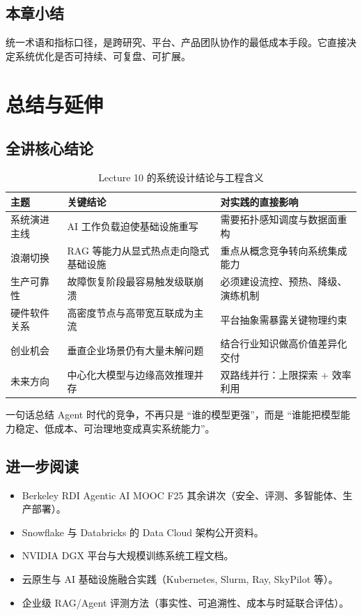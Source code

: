 \documentclass[a4paper]{article}
\begin{document}
\subsection{本章小结}
统一术语和指标口径，是跨研究、平台、产品团队协作的最低成本手段。它直接决定系统优化是否可持续、可复盘、可扩展。

\section{总结与延伸}

\subsection{全讲核心结论}
\begin{table}[H]
\centering
\begin{tabular}{p{3.0cm}p{4.0cm}p{4.4cm}}
\toprule
\textbf{主题} & \textbf{关键结论} & \textbf{对实践的直接影响} \\
\midrule
系统演进主线 & AI 工作负载迫使基础设施重写 & 需要拓扑感知调度与数据面重构 \\
浪潮切换 & RAG 等能力从显式热点走向隐式基础设施 & 重点从概念竞争转向系统集成能力 \\
生产可靠性 & 故障恢复阶段最容易触发级联崩溃 & 必须建设流控、预热、降级、演练机制 \\
硬件软件关系 & 高密度节点与高带宽互联成为主流 & 平台抽象需暴露关键物理约束 \\
创业机会 & 垂直企业场景仍有大量未解问题 & 结合行业知识做高价值差异化交付 \\
未来方向 & 中心化大模型与边缘高效推理并存 & 双路线并行：上限探索 + 效率利用 \\
\bottomrule
\end{tabular}
\caption{Lecture 10 的系统设计结论与工程含义}
\end{table}

\begin{importantbox}{一句话总结}
Agent 时代的竞争，不再只是 ``谁的模型更强''，而是 ``谁能把模型能力稳定、低成本、可治理地变成真实系统能力''。
\end{importantbox}

\subsection{进一步阅读}
\begin{itemize}
    \item Berkeley RDI Agentic AI MOOC F25 其余讲次（安全、评测、多智能体、生产部署）。
    \item Snowflake 与 Databricks 的 Data Cloud 架构公开资料。
    \item NVIDIA DGX 平台与大规模训练系统工程文档。
    \item 云原生与 AI 基础设施融合实践（Kubernetes, Slurm, Ray, SkyPilot 等）。
    \item 企业级 RAG/Agent 评测方法（事实性、可追溯性、成本与时延联合评估）。
\end{itemize}
\end{document}
